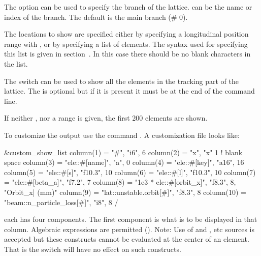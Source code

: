 {{{\begin{description}
The  option can be used to specify the branch of
the lattice.  can be the name or index of the branch.
The default is the main branch (\# 0).

The locations to show are specified either by specifying a
longitudinal position range with , or by specifying a list
 of elements.  The syntax used for specifying this
list is given in section~.  In this case there
should be no blank characters in the list.

The  switch can be used to show all the elements
in the tracking part of the lattice. The
 is optional but if it is present it must be at the
end of the command line.

If neither , nor a range is given,
the first 200 elements are shown.

To customize the output use the command . A customization file looks like:
\begin{example}
  &custom_show_list
    column(1)  = "#",                      "i6",     6 
    column(2)  = "x",                      "x"       1   ! blank space
    column(3)  = "ele::#[name]",           "a",      0
    column(4)  = "ele::#[key]",            "a16",   16
    column(5)  = "ele::#[s]",              "f10.3", 10
    column(6)  = "ele::#[l]",              "f10.3", 10
    column(7)  = "ele::#[beta_a]",         "f7.2",   7
    column(8)  = "1e3 * ele::#[orbit_x]",  "f8.3",   8, "Orbit_x| (mm)" 
    column(9)  = "lat::unstable.orbit[#]", "f8.3",   8 
    column(10) = "beam::n_particle_loss[#]", "i8",   8 
  /
\end{example}
each  has four components. The first component is what
is to be displayed in that column. Algebraic expressions are permitted
(). Note: Use of  and , etc
sources is accepted but these constructs cannot be evaluated at the
center of an element. That is the  switch will have no
effect on such constructs.


\end{description}}}}

